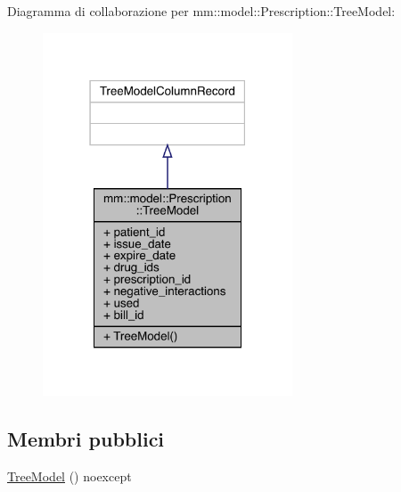 Diagramma di collaborazione per mm\+:\+:model\+:\+:Prescription\+:\+:Tree\+Model\+:
\nopagebreak
\begin{figure}[H]
\begin{center}
\leavevmode
\includegraphics[width=210pt]{de/d92/structmm_1_1model_1_1_prescription_1_1_tree_model__coll__graph}
\end{center}
\end{figure}
\subsection*{Membri pubblici}
\begin{DoxyCompactItemize}
\item 
\mbox{\hyperlink{structmm_1_1model_1_1_prescription_1_1_tree_model_a3b6f84fdc2b7a9f83e4c9ec7594a534d}{Tree\+Model}} () noexcept
\end{DoxyCompactItemize}
